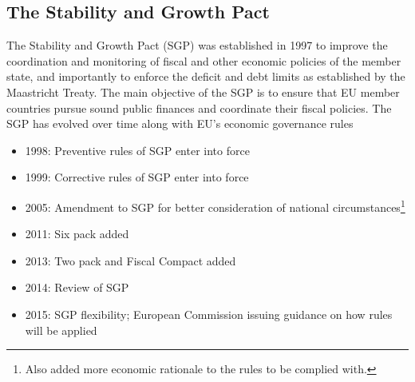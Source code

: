 \documentclass{tufte-handout}
\begin{document}
\subsection{The Stability and Growth Pact}
The Stability and Growth Pact (SGP) was established in 1997 to improve the coordination and monitoring of fiscal and other economic policies of the member state, and importantly to enforce the deficit and debt limits as established by the Maastricht Treaty. 
The main objective of the SGP is to ensure that EU member countries pursue sound public finances and coordinate their fiscal policies. 
The SGP has evolved over time along with EU's economic governance rules
\begin{itemize}
  \item 1998: Preventive rules of SGP enter into force
  \item 1999: Corrective rules of SGP enter into force
  \item 2005: Amendment to SGP for better consideration of national circumstances\footnote{Also added more economic rationale to the rules to be complied with.}
  \item 2011: Six pack added
  \item 2013: Two pack and Fiscal Compact added
  \item 2014: Review of SGP
  \item 2015: SGP flexibility; European Commission issuing guidance on how rules will be applied
\end{itemize}
\end{document}
